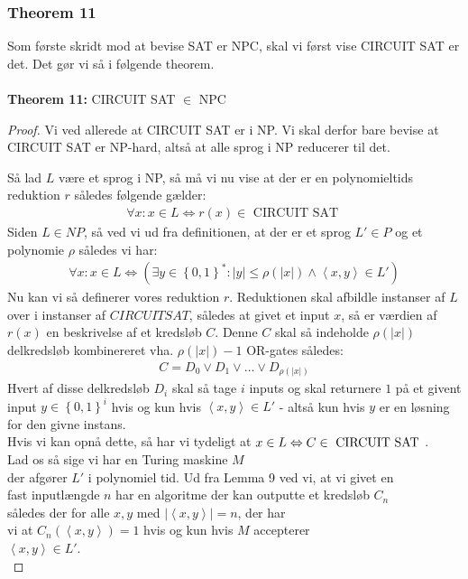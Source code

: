 

\subsubsection{Theorem 11}

Som første skridt mod at bevise SAT er NPC, skal vi først vise CIRCUIT SAT er
det. Det gør vi så i følgende theorem.\\ ~\\ \textbf{Theorem 11:} CIRCUIT SAT
$\in$ NPC

\begin{proof} Vi ved allerede at CIRCUIT SAT er i NP. Vi skal derfor bare bevise
at CIRCUIT SAT er NP-hard, altså at alle sprog i NP reducerer til det.

Så lad $L$ være et sprog i NP, så må vi nu vise at der er en polynomieltids
reduktion $r$ således følgende gælder: \begin{align*} \forall x: x \in L
\Leftrightarrow r(x) \in \text{ CIRCUIT SAT } \end{align*} Siden $L \in NP$,
så ved vi ud fra definitionen, at der er et sprog $L' \in P$ og et polynomie
$\rho$ således vi har: \begin{align*} \forall x : x \in L \Leftrightarrow
(\exists y \in \left\lbrace 0,1 \right\rbrace^* : |y| \leq \rho(|x|) \wedge
\left\langle x,y \right\rangle \in L') \end{align*} Nu kan vi så definerer
vores reduktion $r$. Reduktionen skal afbildle instanser af $L$ over i instanser
af $CIRCUIT SAT$, således at givet et input $x$, så er værdien af $r(x)$
en beskrivelse af et kredsløb $C$. Denne $C$ skal så indeholde $\rho(|x|)$
delkredsløb kombinereret vha. $\rho(|x|)-1$ OR-gates således: \begin{align*}
C = D_0 \vee D_1 \vee \hdots \vee D_{\rho(|x|)} \end{align*} Hvert af disse
delkredsløb $D_i$ skal så tage $i$ inputs og skal returnere $1$ på et givent
input $y \in \left\lbrace 0,1 \right\rbrace^i$ hvis og kun hvis $\left\langle
x,y \right\rangle \in L'$ - altså kun hvis $y$ er en løsning for den givne
instans.\\

Hvis vi kan opnå dette, så har vi tydeligt at $x \in L \Leftrightarrow C    \\
\in \text{ CIRCUIT SAT }$. ~ Lad os så sige vi har en Turing maskine $M$     \\
der afgører $L'$ i polynomiel tid. Ud fra Lemma 9 ved vi, at vi givet en     \\
fast inputlængde $n$ har en algoritme der kan outputte et kredsløb $C_n$    \\
således der for alle $x,y$ med $|\left\langle x,y \right\rangle|=n$, der har \\
vi at $C_n(\left\langle x,y \right\rangle)=1$ hvis og kun hvis $M$ accepterer \\
$\left\langle x,y \right\rangle \in L'$.                                      \\


\end{proof}
